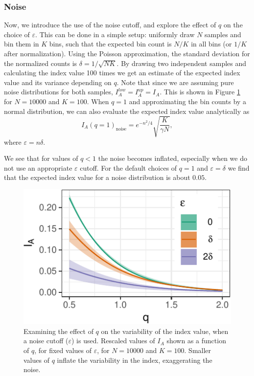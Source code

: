 \documentclass[]{interact}
\theoremstyle{plain}%
\theoremstyle{definition}
\theoremstyle{remark}
\begin{document}
\hypertarget{noise}{%
\subsubsection{Noise}\label{noise}}

Now, we introduce the use of the noise cutoff, and explore the effect of
\(q\) on the choice of \(\varepsilon\). This can be done in a simple
setup: uniformly draw \(N\) samples and bin them in \(K\) bins, such
that the expected bin count is \(N/K\) in all bins (or \(1/K\) after
normalization). Using the Poisson approximation, the standard deviation
for the normalized counts is \(\delta=1/\sqrt{N K}\). By drawing two
independent samples and calculating the index value 100 times we get an
estimate of the expected index value and its variance depending on
\(q\). Note that since we are assuming pure noise distributions for both
samples, \(I_A^{low}=I_A^{up}=I_A\). This is shown in Figure
\ref{fig:noise} for \(N=10000\) and \(K=100\). When \(q=1\) and
approximating the bin counts by a normal distribution, we can also
evaluate the expected index value analytically as \begin{equation}
I_A(q=1)_{\mathrm{noise}} = e^{-n^2/4} \sqrt{\frac{K}{\gamma N}},
\end{equation} where \(\varepsilon=n\delta\).

We see that for values of \(q<1\) the noise becomes inflated, especially
when we do not use an appropriate \(\varepsilon\) cutoff. For the
default choices of \(q=1\) and \(\varepsilon=\delta\) we find that the
expected index value for a noise distribution is about \(0.05\).

\begin{figure}

{\centering \includegraphics[width=0.5\linewidth]{section_pursuit_files/figure-latex/noise-1} 

}

\caption{Examining the  effect of $q$ on the variability of the  index value, when a noise cutoff ($\varepsilon$) is used. Rescaled values of $I_A$ shown as a function of $q$, for fixed values of $\varepsilon$, for $N=10000$ and $K=100$. Smaller values of  $q$ inflate the variability in the index, exaggerating  the noise.}\label{fig:noise}
\end{figure}
\end{document}
